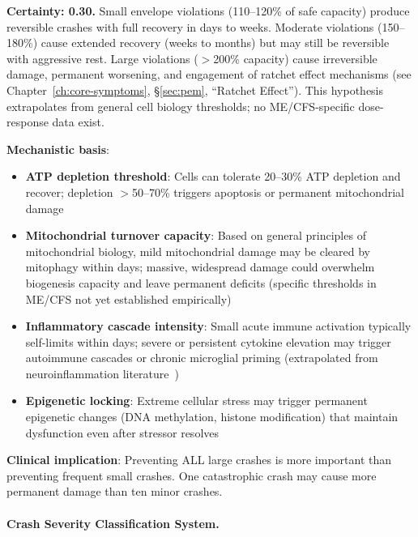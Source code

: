 \begin{hypothesis}
\textbf{Certainty: 0.30.} Small envelope violations (110--120\% of safe capacity) produce reversible crashes with full recovery in days to weeks. Moderate violations (150--180\%) cause extended recovery (weeks to months) but may still be reversible with aggressive rest. Large violations ($>$200\% capacity) cause irreversible damage, permanent worsening, and engagement of ratchet effect mechanisms (see Chapter~\ref{ch:core-symptoms}, \S\ref{sec:pem}, ``Ratchet Effect''). This hypothesis extrapolates from general cell biology thresholds; no ME/CFS-specific dose-response data exist.

\textbf{Mechanistic basis}:
\begin{itemize}
    \item \textbf{ATP depletion threshold}: Cells can tolerate 20--30\% ATP depletion and recover; depletion $>$50--70\% triggers apoptosis or permanent mitochondrial damage~\cite{heng2025mecfs}
    \item \textbf{Mitochondrial turnover capacity}: Based on general principles of mitochondrial biology, mild mitochondrial damage may be cleared by mitophagy within days; massive, widespread damage could overwhelm biogenesis capacity and leave permanent deficits (specific thresholds in ME/CFS not yet established empirically)
    \item \textbf{Inflammatory cascade intensity}: Small acute immune activation typically self-limits within days; severe or persistent cytokine elevation may trigger autoimmune cascades or chronic microglial priming (extrapolated from neuroinflammation literature~\cite{Nakatomi2014neuroinflammation})
    \item \textbf{Epigenetic locking}: Extreme cellular stress may trigger permanent epigenetic changes (DNA methylation, histone modification) that maintain dysfunction even after stressor resolves~\cite{Lawless2015mtdna_damage}
\end{itemize}

\textbf{Clinical implication}: Preventing ALL large crashes is more important than preventing frequent small crashes. One catastrophic crash may cause more permanent damage than ten minor crashes.
\end{hypothesis}

\paragraph{Crash Severity Classification System.}

